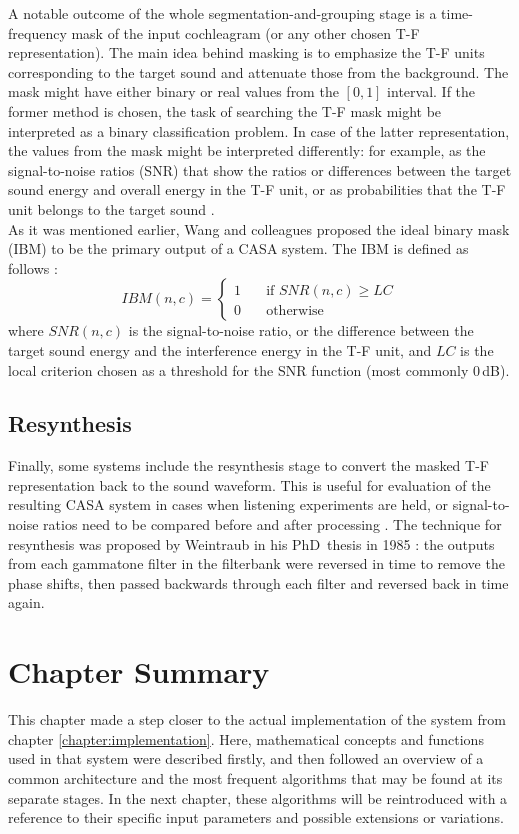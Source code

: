 A notable outcome of the whole segmentation-and-grouping stage is a time-frequency mask of the input cochleagram (or any other chosen T-F representation). The main idea behind masking is to emphasize the T-F units corresponding to the target sound and attenuate those from the background. The mask might have either binary or real values from the $[0, 1]$ interval. If the former method is chosen, the task of searching the T-F mask might be interpreted as a binary classification problem. In case of the latter representation, the values from the mask might be interpreted differently: for example, as the signal-to-noise ratios (SNR) that show the ratios or differences between the target sound energy and overall energy in the T-F unit, or as probabilities that the T-F unit belongs to the target sound \cite{Wang2006}.\\

As it was mentioned earlier, Wang and colleagues \cite{Wang2005} proposed the ideal binary mask (IBM) to be the primary output of a CASA system. The IBM is defined as follows \cite{Wang2006}\cite{Wang2012}:
\begin{equation}
	IBM(n, c) = 
	\begin{cases}
		1 & \quad\text{if } SNR(n, c) \ge LC \\
		0 & \quad\text{otherwise}
	\end{cases}
\end{equation}
where $SNR(n, c)$ is the signal-to-noise ratio, or the difference between the target sound energy and the interference energy in the T-F unit, and $LC$ is the local criterion chosen as a threshold for the SNR function (most commonly 0\,dB).

\subsection{Resynthesis}\label{subsection:casa_resynthesis}

Finally, some systems include the resynthesis stage to convert the masked T-F representation back to the sound waveform. This is useful for evaluation of the resulting CASA system in cases when listening experiments are held, or signal-to-noise ratios need to be compared before and after processing \cite{Wang2006}. The technique for resynthesis was proposed by Weintraub in his PhD~thesis in 1985 \cite{Weintraub1985}: the outputs from each gammatone filter in the filterbank were reversed in time to remove the phase shifts, then passed backwards through each filter and reversed back in time again.

\section{Chapter Summary}

This chapter made a step closer to the actual implementation of the system from chapter \ref{chapter:implementation}. Here, mathematical concepts and functions used in that system were described firstly, and then followed an overview of a common architecture and the most frequent algorithms that may be found at its separate stages. In the next chapter, these algorithms will be reintroduced with a reference to their specific input parameters and possible extensions or variations.
